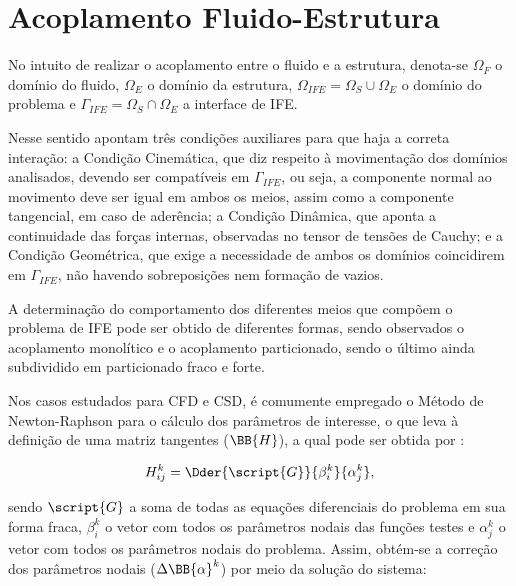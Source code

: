\documentclass[_ArquivoPrincipal.tex]{subfiles}
\begin{document}
\section{Acoplamento Fluido-Estrutura} \label{AFE}

No intuito de realizar o acoplamento entre o fluido e a estrutura, denota-se $\Omega_F$ o domínio do fluido, $\Omega_E$ o domínio da estrutura, $\Omega_{IFE}=\Omega_S\cup\Omega_E$ o domínio do problema e $\Gamma_{IFE}=\Omega_S\cap\Omega_E$ a interface de IFE.

Nesse sentido  apontam três condições auxiliares para que haja a correta interação: a Condição Cinemática, que diz respeito à movimentação dos domínios analisados, devendo ser compatíveis em $\Gamma_{IFE}$, ou seja, a componente normal ao movimento deve ser igual em ambos os meios, assim como a componente tangencial, em caso de aderência; a Condição Dinâmica, que aponta a continuidade das forças internas, observadas no tensor de tensões de Cauchy; e a Condição Geométrica, que exige a necessidade de ambos os domínios coincidirem em $\Gamma_{IFE}$, não havendo sobreposições nem formação de vazios.

A determinação do comportamento dos diferentes meios que compõem o problema de IFE pode ser obtido de diferentes formas, sendo observados o acoplamento monolítico e o acoplamento particionado, sendo o último ainda subdividido em particionado fraco e forte.

Nos casos estudados para CFD e CSD, é comumente empregado o Método de Newton-Raphson para o cálculo dos parâmetros de interesse, o que leva à definição de uma matriz tangentes ($\BB{H}$), a qual pode ser obtida por \cite{bazilevs2013computational,sanches2022metodos}:

\begin{equation}
    H_{ij}^k=\Dder{\script{G}}{\beta_i^k}{\alpha_j^k}\text{,}
\end{equation}

\noindent sendo $\script{G}$ a soma de todas as equações diferenciais do problema em sua forma fraca, $\beta_i^k$ o vetor com todos os parâmetros nodais das funções testes e $\alpha_j^k$ o vetor com todos os parâmetros nodais do problema. Assim, obtém-se a correção dos parâmetros nodais ($\Delta\BB{\alpha}^k$) por meio da solução do sistema:
\end{document}
